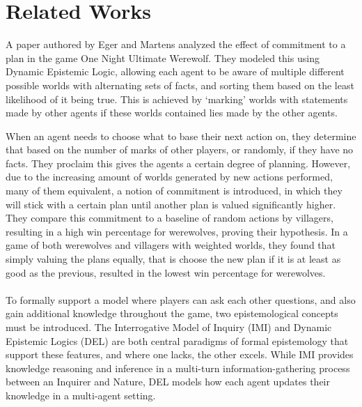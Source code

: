 \section{Related Works}
A paper authored by Eger and Martens\cite{commitment} analyzed the effect of
commitment to a plan in the game One Night Ultimate Werewolf. They modeled this
using Dynamic Epistemic Logic, allowing each agent to be aware of multiple
different possible worlds with alternating sets of facts, and sorting them
based on the least likelihood of it being true. This is achieved by ‘marking’
worlds with statements made by other agents if these worlds contained lies made
by the other agents.

When an agent needs to choose what to base their next action on, they determine
that based on the number of marks of other players, or randomly, if they have
no facts. They proclaim this gives the agents a certain degree of planning.
However, due to the increasing amount of worlds generated by new actions
performed, many of them equivalent, a notion of commitment is introduced, in
which they will stick with a certain plan until another plan is valued
significantly higher. They compare this commitment to a baseline of random
actions by villagers, resulting in a high win percentage for werewolves,
proving their hypothesis. In a game of both werewolves and villagers with
weighted worlds, they found that simply valuing the plans equally, that is
choose the new plan if it is at least as good as the previous, resulted in the
lowest win percentage for werewolves.\\ \\
 To formally support a model where players can ask 
each other questions, and also gain additional 
knowledge throughout the game, two epistemological 
concepts must be introduced. The Interrogative 
Model of Inquiry (IMI) and Dynamic Epistemic 
Logics (DEL) are both central paradigms of formal 
epistemology that support these features, and 
where one lacks, the other
excels. While IMI provides knowledge reasoning and inference in a multi-turn
information-gathering process between an Inquirer and Nature, DEL models how
each agent updates their knowledge in a multi-agent setting.

